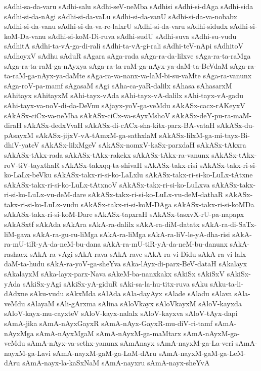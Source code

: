 {sAdhi-sa-da-varu
sAdhi-salu
sAdhi-seV-neMba
sAdhisi
sAdhi-si-dAga
sAdhi-sida
sAdhi-si-da-nAgi
sAdhi-si-da-vaLu
sAdhi-si-da-vanU
sAdhi-si-da-va-nobabx
sAdhi-si-da-vanu
sAdhi-si-da-va-re-lalxrU
sAdhi-si-da-varu
sAdhi-sidudx
sAdhi-si-koM-Da-vanu
sAdhi-si-koM-Di-ruva
sAdhi-sudU
sAdhi-suva
sAdhi-su-vudu
sAdhitA
sAdhi-ta-vA-ga-di-rali
sAdhi-ta-vA-gi-rali
sAdhi-teV-nApi
sAdhitoV
sAdhoyxV
sAdhu
sAduR
sAgara
sAga-rada
sAga-ra-da-lilxve
sAga-ra-ta-raMga
sAga-ra-ta-raM-ga-nAyxya
sAga-ra-ta-raM-ga-nAyx-ya-daM-ta-BeVdaM
sAga-ra-ta-raM-ga-nAyx-ya-daMte
sAga-ra-va-nanx-va-laM-bi-su-vaMte
sAga-ra-vanunx
sAga-roV-pa-mamf
sAgasaM
sAgi
sAha-ca-yaR-dalilx
sAhasa
sAhasarxM
sAhitayx
sAhitayxM
sAhi-tayx-vAda
sAhi-tayx-vA-dalilx
sAhi-tayx-vA-gadu
sAhi-tayx-va-noV-di-da-DeVnu
sAjayx-yoV-ga-veMdu
sAkASx-cacx-rAKeyxV
sAkASx-ciCx-va-neMba
sAkASx-ciCx-va-sAyxMshoV
sAkASx-deY-pu-ra-maM-diraH
sAkASx-dedxVvaH
sAkASx-di-cACx-sha-kitx-parx-BA-vataH
sAkASx-du-pAsayxM
sAkASx-jijxV-vA-tAmxM-ga-sathxlaM
sAkASx-lilxM-ga-mi-tayx-Bi-dhiV-yateV
sAkASx-lilxMgeV
sAkASx-nomxV-kaSx-parxdaH
sAkASx-tAkxra
sAkASx-tAkx-rada
sAkASx-tAkx-rakekx
sAkASx-tAkx-ra-vanunx
sAkASx-tAkx-roV-tiV-tayxthaR
sAkASx-takxqq-ta-shivaH
sAkASx-takx-risi
sAkASx-takx-ri-si-ko-LaLx-beVku
sAkASx-takx-ri-si-ko-LaLxlu
sAkASx-takx-ri-si-ko-LuLx-tAtxne
sAkASx-takx-ri-si-ko-LuLx-tAtxnoV
sAkASx-takx-ri-si-ko-LuLxva
sAkASx-takx-ri-si-ko-LuLx-vu-deM-dare
sAkASx-takx-ri-si-ko-LuLx-vu-deM-dathaR
sAkASx-takx-ri-si-ko-LuLx-vudu
sAkASx-takx-ri-si-koM-DAga
sAkASx-takx-ri-si-koMDa
sAkASx-takx-ri-si-koM-Dare
sAkASx-tapxraH
sAkASx-tasxvX-rU-pa-napapx
sAkASxtf
sAkAda
sAkAra
sAkA-ra-dalilx
sAkA-ra-diM-datatx
sAkA-ra-di-SaTx-liM-gava
sAkA-ra-gu-ru-liMga
sAkA-ra-liMga
sAkA-ra-liV-le-yA-dha-risi
sAkA-ra-mU-tiR-yA-da-neM-bu-dana
sAkA-ra-mU-tiR-yA-da-neM-bu-danunx
sAkA-rashacx
sAkA-ra-vAgi
sAkA-rava
sAkA-rave
sAkA-ra-vi-Didu
sAkA-ra-vi-lalx-daM-ta-hudu
sAkA-ra-yoV-ga-sheYva
sAka-lAyx-di-parx-BeV-dataH
sAkalayx
sAkalayxM
sAka-layx-parx-Nava
sAkeM-ba-nanxkakx
sAkiSx
sAkiSxV
sAkiSx-yAda
sAkiSx-yAgi
sAkiSx-yA-giduR
sAki-sa-la-hu-titx-ruva
sAku
sAku-ta-li-dAdxne
sAku-vudu
sAkxMda
sAlAda
sAla-dayAyx
sAlade
sAladu
sAlava
sAla-veMdu
sAlayaM
sAli-gArxma
sAlina
sAloVkayx
sAloVkayxM
sAloV-kayxda
sAloV-kayx-mu-cayxteV
sAloV-kayx-nalalx
sAloV-kayxva
sAloV-tAyx-dapi
sAmA-jika
sAmA-nAyxGayxR
sAmA-nAyx-GayxR-mu-diV-ri-tamf
sAmA-nAyxMga
sAmA-nAyxMgaM
sAmA-nAyxM-ga-maMtarx
sAmA-nAyxM-ga-veMdu
sAmA-nAyx-va-sethx-yanunx
sAmAnayx
sAmA-nayxM-ga-La-veri
sAmA-nayxM-ga-Lavi
sAmA-nayxM-gaM-ga-LaM-dAru
sAmA-nayxM-gaM-ga-LeM-dAru
sAmA-nayx-la-kaSxNaM
sAmA-nayxru
sAmA-nayx-sheYvA
}

